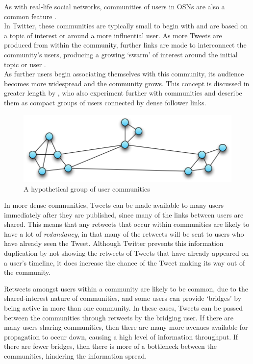 As with real-life social networks, communities of users in OSNs are also a common feature \cite{ugander11}.\\
In Twitter, these communities are typically small to begin with and are based on a topic of interest or around a more influential user. As more Tweets are produced from within the community, further links are made to interconnect the community's users, producing a growing `swarm' of interest around the initial topic or user \cite{java07}. \\
As further users begin associating themselves with this community, its audience becomes more widespread and the community grows. This concept is discussed in greater length by \cite{java07}, who also experiment further with communities and describe them as compact groups of users connected by dense follower links.

\begin{figure}[h]
\centering
\includegraphics[scale=0.7]{2.Background/Media/communities.png} 
\caption{A hypothetical group of user communities}
\label{fig:communities}
\end{figure}

In more dense communities, Tweets can be made available to many users immediately after they are published, since many of the links between users are shared. This means that any retweets that occur within communities are likely to have a lot of \textit{redundancy}, in that many of the retweets will be sent to users who have already seen the Tweet. Although Twitter prevents this information duplication by not showing the retweets of Tweets that have already appeared on a user's timeline, it does increase the chance of the Tweet making its way out of the community.

Retweets amongst users within a community are likely to be common, due to the shared-interest nature of communities, and some users can provide `bridges' by being active in more than one community. In these cases, Tweets can be passed between the communities through retweets by the bridging user. If there are many users sharing communities, then there are many more avenues available for propagation to occur down, causing a high level of information throughput. If there are fewer bridges, then there is more of a bottleneck between the communities, hindering the information spread.

